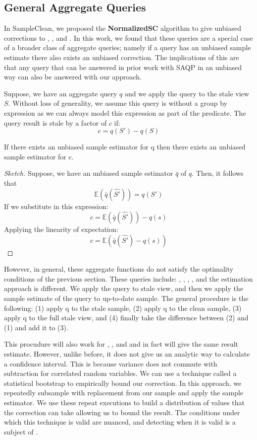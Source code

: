 \subsection{General Aggregate Queries}
In SampleClean, we proposed the \textbf{NormalizedSC} algorithm to give unbiased corrections to \sumfunc, \countfunc, and \avgfunc.
In this work, we found that these queries are a special case of a broader class of aggregate queries; namely if a query has an unbiased sample estimate there also exists an unbiased correction.
The implications of this are that any query that can be answered in prior work with SAQP in an unbiased way can also be answered with our approach.

Suppose, we have an aggregate query $q$ and we apply the query to the stale view $S$.
Without loss of generality, we assume this query is without a group by expression as we can always model this expression as part of the predicate.
The query result is stale by a factor of $c$ if:
\[ c = q(S') - q(S)\] 

\begin{lemma}
If there exists an unbiased sample estimator for q then there exists an unbiased sample estimator for c.
\end{lemma}

\begin{proof}[Sketch] Suppose, we have an unbiased sample estimator $\bar{q}$ of $q$. 
Then, it follows that \[\mathbb{E}(\bar{q}(\hat{S'})) = q(S')\]
If we substitute in this expression:
\[ c = \mathbb{E}(\bar{q}(\hat{S'})) -q(s) \] 
Applying the linearity of expectation:
\[ c = \mathbb{E}(\bar{q}(\hat{S'}) - q(s)) \]
\end{proof}

However, in general, these aggregate functions do not satisfy the optimality conditions of the previous section.
These queries include: \histfunc, \corrfunc, \varfunc, \covfunc, and the estimation approach is different.
We apply the query to stale view, and then we apply the sample estimate of the query to up-to-date sample.
The general procedure is the following: (1) apply q to the stale sample, (2) apply q to the clean sample, (3) apply q to the full stale view, and (4) finally take the difference between (2) and (1) and add it to (3). 

This procudure will also work for \sumfunc, \countfunc, and \avgfunc and in fact will give the same result estimate.
However, unlike before, it does not give us an analytic way to calculate a confidence interval.
This is because variance does not commute with subtraction for correlated random variables.
We can use a technique called a statistical bootstrap \cite{AgarwalMPMMS13} to empirically bound our correction.
In this approach, we repeatedly subsample with replacement from our sample and apply the sample estimator.
We use these repeat executions to build a distribution of values that the correction can take allowing us to bound the result.
The conditions under which this technique is valid are nuanced, and detecting when it is valid is a subject of \cite{agarwalknowing}.


